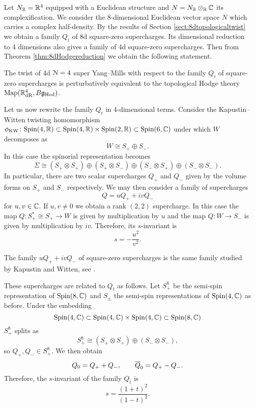 \documentclass[10pt, oneside]{article}
\newcommand{\Hod}{\mathrm{Hod}}
\begin{document}
Let $N_\RR=\RR^4$ equipped with a Euclidean structure and $N=N_\RR\otimes_\RR\CC$ its complexification. We consider the 8-dimensional Euclidean vector space $N$ which carries a complex half-density. By the results of Section \ref{sect:8dtopologicaltwist} we obtain a family $Q_t$ of 8d square-zero supercharges. Its dimensional reduction to 4 dimensions also gives a family of 4d square-zero supercharges. Then from Theorem \ref{thm:8dHodgereduction} we obtain the following statement.

\begin{theorem}
The twist of 4d $\cN=4$ super Yang--Mills with respect to the family $Q_t$ of square-zero supercharges is perturbatively equivalent to the topological Hodge theory $\map(\RR^4_{\mathrm{dR}}, B\fg_{\Hod})$.
\label{thm:4d422Hodgetwist}
\end{theorem}

Let us now rewrite the family $Q_t$ in 4-dimensional terms. Consider the Kapustin--Witten twisting homomorphism $\phi_{\mathrm{KW}}\colon \Spin(4, \RR)\subset \Spin(4, \RR)\times \Spin(2, \RR)\subset \Spin(6, \CC)$ under which $W$ decomposes as
\[W\cong S_+\oplus S_-.\]
In this case the spinorial representation becomes
\[\Sigma\cong (S_+\otimes S_+)\oplus (S_+\otimes S_-)\oplus (S_-\otimes S_+)\oplus (S_-\otimes S_-).\]
In particular, there are two scalar supercharges $Q_+$ and $Q_-$ given by the volume forms on $S_+$ and $S_-$ respectively. We may then consider a family of supercharges
\[Q = u Q_+ + i v Q_-\]
for $u, v\in\CC$. If $u,v\neq 0$ we obtain a rank $(2, 2)$ supercharge. In this case the map $Q\colon S_+^*\cong S_+\rightarrow W$ is given by multiplication by $u$ and the map $Q\colon W\rightarrow S_-$ is given by multiplication by $iv$. Therefore, its $s$-invariant is
\[s = -\frac{u^2}{v^2}.\]

\begin{remark}
The family $uQ_+ + iv Q_-$ of square-zero supercharges is the same family studied by Kapustin and Witten, see \cite[Section 3.1]{KapustinWitten}.
\end{remark}

These supercharges are related to $Q_t$ as follows. Let $S_+^8$ be the semi-spin representation of $\Spin(8, \CC)$ and $S_\pm$ the semi-spin representations of $\Spin(4, \CC)$ as before. Under the embedding
\[\Spin(4, \CC)\subset \Spin(4, \CC)\times \Spin(4, \CC)\subset \Spin(8, \CC)\]
$S_+^8$ splits as
\[S_+^8\cong (S_+\otimes S_+)\oplus (S_-\otimes S_-),\]
so $Q_+, Q_-\in S_+^8$. We then obtain
\[Q_0 = Q_+ + Q_-,\qquad \Bar{Q}_0 = Q_+ - Q_-.\]
Therefore, the $s$-invariant of the family $Q_t$ is
\begin{equation}
s = \frac{(1+t)^2}{(1-t)^2}.
\label{eq:4d4sinvariant}
\end{equation}
\end{document}
